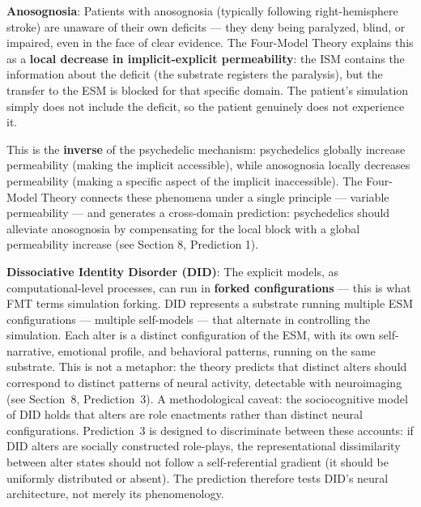 \documentclass[12pt]{article}
\newcommand{\revstart}{}
\newcommand{\revend}{}
\begin{document}
\textbf{Anosognosia}: Patients with anosognosia (typically following right-hemisphere stroke) are unaware of their own deficits --- they deny being paralyzed, blind, or impaired, even in the face of clear evidence. The Four-Model Theory explains this as a \textbf{local decrease in implicit-explicit permeability}: the ISM contains the information about the deficit (the substrate registers the paralysis), but the transfer to the ESM is blocked for that specific domain. The patient's simulation simply does not include the deficit, so the patient genuinely does not experience it.

This is the \textbf{inverse} of the psychedelic mechanism: psychedelics globally increase permeability (making the implicit accessible), while anosognosia locally decreases permeability (making a specific aspect of the implicit inaccessible). The Four-Model Theory connects these phenomena under a single principle --- variable permeability --- and generates a cross-domain prediction: psychedelics should alleviate anosognosia by compensating for the local block with a global permeability increase (see Section 8, Prediction 1).

\textbf{Dissociative Identity Disorder (DID)}: The explicit models, as computational-level processes, can run in \textbf{forked configurations} --- this is what FMT terms simulation forking. DID represents a substrate running multiple ESM configurations --- multiple self-models --- that alternate in controlling the simulation. Each alter is a distinct configuration of the ESM, with its own self-narrative, emotional profile, and behavioral patterns, running on the same substrate. This is not a metaphor: the theory predicts that distinct alters should correspond to distinct patterns of neural activity, detectable with neuroimaging (see Section~8, Prediction~3). {\revstart A methodological caveat: the sociocognitive model of DID \citep{Lilienfeld1999,Lynn2012} holds that alters are role enactments rather than distinct neural configurations. Prediction~3 is designed to discriminate between these accounts: if DID alters are socially constructed role-plays, the representational dissimilarity between alter states should not follow a self-referential gradient (it should be uniformly distributed or absent). The prediction therefore tests DID's neural architecture, not merely its phenomenology.\revend}
\end{document}
